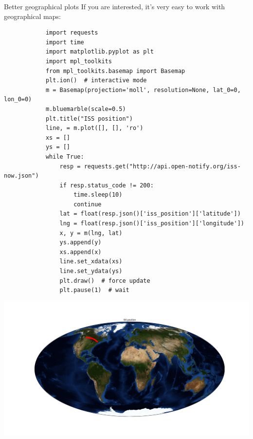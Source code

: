 \documentclass[aspectratio=169,handout]{beamer}
\begin{document}
\begin{frame}[fragile]{Better geographical plots}
    If you are interested, it's very easy to work with geographical maps:
    \begin{minipage}{0.49\textwidth}
        \begin{verbatim}
            import requests
            import time
            import matplotlib.pyplot as plt
            import mpl_toolkits
            from mpl_toolkits.basemap import Basemap
            plt.ion()  # interactive mode
            m = Basemap(projection='moll', resolution=None, lat_0=0, lon_0=0)
            m.bluemarble(scale=0.5)
            plt.title("ISS position")
            line, = m.plot([], [], 'ro')
            xs = []
            ys = []
            while True:
                resp = requests.get("http://api.open-notify.org/iss-now.json")
                if resp.status_code != 200:
                    time.sleep(10)
                    continue
                lat = float(resp.json()['iss_position']['latitude'])
                lng = float(resp.json()['iss_position']['longitude'])
                x, y = m(lng, lat)
                ys.append(y)
                xs.append(x)
                line.set_xdata(xs)
                line.set_ydata(ys)
                plt.draw()  # force update
                plt.pause(1)  # wait

        \end{verbatim}
    \end{minipage}
    \pause
    \begin{minipage}{0.49\textwidth}
        \begin{flushright}
        \includegraphics[width=.8\textwidth]{./plots/plot_iss_better.png}
        \end{flushright}
    \end{minipage}
\end{frame}
\end{document}
